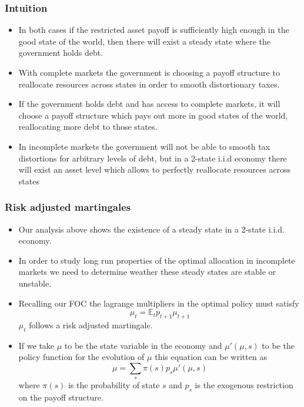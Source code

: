 \documentclass{beamer}
\newcommand{\EE}{\mathbb E}
\begin{document}
 \begin{frame}
  \frametitle{Intuition}
	\begin{itemize}
		\item  In both cases if the restricted asset payoff is sufficiently high enough in the good state of the world, then there will exist a steady state where the government holds debt.
		\item With complete markets the government is choosing a payoff structure to reallocate resources across states in order to smooth distortionary taxes.
		\item If the government holds debt and has access to complete markets, it will choose a payoff structure which pays out more in good states of the world, reallocating more debt to those states.
		\item In incomplete markets the government will not be able to smooth tax distortions for arbitrary levels of debt, but in a 2-state i.i.d economy there will exist an asset level which allows to perfectly reallocate resources across states
	\end{itemize}
 \end{frame}

 \begin{frame}
  \frametitle{Risk adjusted martingales}
	\begin{itemize}
		\item Our analysis above shows the existence of a steady state in a 2-state i.i.d. economy.  
		\item In order to study long run properties of the optimal allocation in incomplete markets we need to determine weather these steady states are stable or unstable.
		\item Recalling our FOC the lagrange multipliers in the optimal policy must satisfy
		\[ 
			\mu_t = \EE_t p_{t+1} \mu_{t+1}
		\] $\mu_t$ follows a risk adjusted martingale.
		\item If we take $\mu$ to be the state variable in the economy and $\mu'(\mu,s)$ to be the policy function for the evolution of $\mu$ this equation can be written as
		\[ 
			\mu = \sum_s \pi(s) p_s \mu'(\mu,s)
		\] where $\pi(s)$ is the probability of state $s$ and $p_s$ is the exogenous restriction on the payoff structure.
	\end{itemize}
	
 \end{frame}
 
\end{document}
